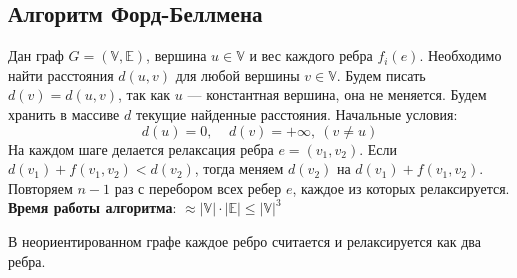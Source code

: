 \documentclass[russian]{lecture-notes}
\begin{document}
	\subsection{Алгоритм Форд-Беллмена}
	Дан граф $G = (\mathbb{V}, \mathbb{E})$, вершина $u \in \mathbb{V}$ и вес каждого ребра $f_i(e)$. Необходимо найти расстояния $d(u,v)$ для любой вершины $v \in \mathbb{V}$. Будем писать $d(v) = d(u,v)$, так как $u$ --- константная вершина, она не меняется. Будем хранить в массиве $d$ текущие найденные расстояния. Начальные условия:
	$$d(u) = 0,~~~~~d(v) = +\infty,~(v \neq u)$$
	На каждом шаге делается релаксация ребра $e = (v_1, v_2)$. Если $d(v_1)+f(v_1,v_2) < d(v_2)$, тогда меняем $d(v_2)$ на $d(v_1)+f(v_1,v_2)$. Повторяем $n-1$ раз с перебором всех ребер $e$, каждое из которых релаксируется.\\
	\textbf{Время работы алгоритма}: $\approx |\mathbb{V}|\cdot|\mathbb{E}| \leq |\mathbb{V}|^3$
	\begin{remark}
		В неориентированном графе каждое ребро считается и релаксируется как два ребра.
	\end{remark}
\end{document}

